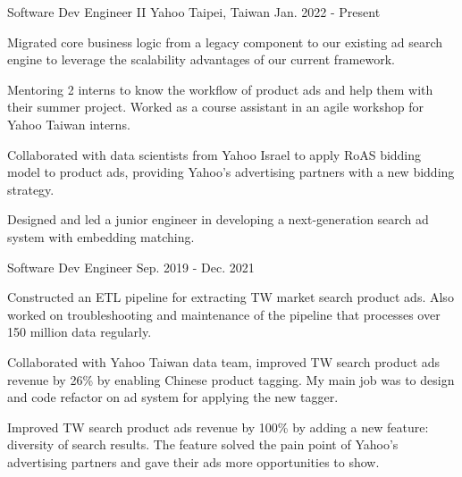 

\begin{cventries}

  \cventry
    {Software Dev Engineer II} %
    {Yahoo} %
    {Taipei, Taiwan} %
    {Jan. 2022 - Present} %
    {
      \begin{cvitems} %
        \item {Migrated core business logic from a legacy component to our existing ad search engine to leverage the scalability advantages of our current framework.}
        \item {Mentoring 2 interns to know the workflow of product ads and help them with their summer project. Worked as a course assistant in an agile workshop for Yahoo Taiwan interns.}
        \item {Collaborated with data scientists from Yahoo Israel to apply RoAS bidding model to product ads, providing Yahoo's advertising partners with a new bidding strategy.}
        \item {Designed and led a junior engineer in developing a next-generation search ad system with embedding matching.}
      \end{cvitems}
    }

  \cventry
    {Software Dev Engineer} %
    {} %
    {} %
    {Sep. 2019 - Dec. 2021} %
    {
      \begin{cvitems} %
        \item {Constructed an ETL pipeline for extracting TW market search product ads. Also worked on troubleshooting and maintenance of the pipeline that processes over 150 million data regularly.}
        \item {Collaborated with Yahoo Taiwan data team, improved TW search product ads revenue by 26\% by enabling Chinese product tagging. My main job was to design and code refactor on ad system for applying the new tagger.}
        \item {Improved TW search product ads revenue by 100\% by adding a new feature: diversity of search results. The feature solved the pain point of Yahoo's advertising partners and gave their ads more opportunities to show.}
      \end{cvitems}
    }


\end{cventries}
